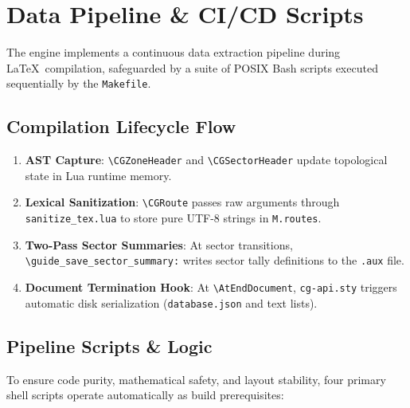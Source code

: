\clearpage
\section{Data Pipeline \& CI/CD Scripts}

The engine implements a continuous data extraction pipeline during \LaTeX\ compilation, safeguarded by a suite of POSIX Bash scripts executed sequentially by the \texttt{Makefile}.

\subsection{Compilation Lifecycle Flow}
\begin{sloppypar}
\begin{enumerate}
    \item \textbf{AST Capture}: \texttt{\textbackslash CGZoneHeader} and \texttt{\textbackslash CGSectorHeader} update topological state in Lua runtime memory.
    \item \textbf{Lexical Sanitization}: \texttt{\textbackslash CGRoute} passes raw arguments through \texttt{sanitize\_tex.lua} to store pure UTF-8 strings in \texttt{M.routes}.
    \item \textbf{Two-Pass Sector Summaries}: At sector transitions, \texttt{\textbackslash guide\_save\_sector\_summary:} writes sector tally definitions to the \texttt{.aux} file.
    \item \textbf{Document Termination Hook}: At \texttt{\textbackslash AtEndDocument}, \texttt{cg-api.sty} triggers automatic disk serialization (\texttt{database.json} and text lists).
\end{enumerate}
\end{sloppypar}

\subsection{Pipeline Scripts \& Logic}
To ensure code purity, mathematical safety, and layout stability, four primary shell scripts operate automatically as build prerequisites:

